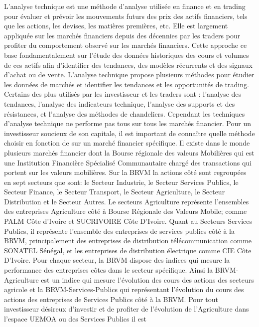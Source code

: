 { L'analyse technique est une méthode d'analyse utilisée en finance et
en trading pour évaluer et prévoir les mouvements futurs des prix des
actifs financiers, tels que les actions, les devises, les matières
premières, etc. Elle est largement appliquée sur les marchés financiers
depuis des décennies par les traders pour profiter du comportement
observé sur les marchés financiers. Cette approche ce base
fondamentalement sur l'étude des données historiques des cours et
volumes de ces actifs afin d'identifier des tendances, des modèles
récurrents et des signaux d'achat ou de vente. L'analyse technique
propose plusieurs méthodes pour étudier les données de marchés et
identifier les tendances et les opportunités de trading. Certains des
plus utilisés par les investisseur et les traders sont : l'analyse des
tendances, l'analyse des indicateurs technique, l'analyse des supports
et des résistances, et l'analyse des méthodes de chandeliers. Cependant
les techniques d'analyse technique ne performe pas tous sur tous les
marchés financier. Pour un investisseur soucieux de son capitale, il est
important de connaître quelle méthode choisir en fonction de sur un
marché financier spécifique. Il existe dans le monde plusieurs marchés
financier dont la Bourse régionale des valeurs Mobilières qui est une
Institution Financière Spécialisé Communautaire chargé des transactions
qui portent sur les valeurs mobilières. Sur la BRVM la actions côté sont
regroupées en sept secteurs que sont: le Secteur Industrie, le Secteur
Services Publics, le Secteur Finance, le Secteur Transport, le Secteur
Agriculture, le Secteur Distribution et le Secteur Autres. Le secteurs
Agriculture représente l'ensembles des entreprises Agriculture côté à
Bourse Régionale des Valeurs Mobile; comme PALM Côte d'Ivoire et
SUCRIVOIRE Côte D'Ivoire. Quant au Secteurs Services Publics, il
représente l'ensemble des entreprises de services publics côté à la
BRVM, principalement des entreprises de distribution télécommunication
comme SONATEL Sénégal, et les entreprises de distribution électrique
comme CIE Côte D'Ivoire. Pour chaque secteur, la BRVM dispose des
indices qui mesure la performance des entreprises côtes dans le secteur
spécifique. Ainsi la BRVM-Agriculture est un indice qui mesure
l'évolution des cours des actions des secteurs agricole et la
BRVM-Services-Publics qui représentant l'évolution du cours des actions
des entreprises de Services Publics côté à la BRVM. Pour tout
investisseur désireux d'investir et de profiter de l'évolution de
l'Agriculture dans l'espace UEMOA ou des Services Publics il est
}
